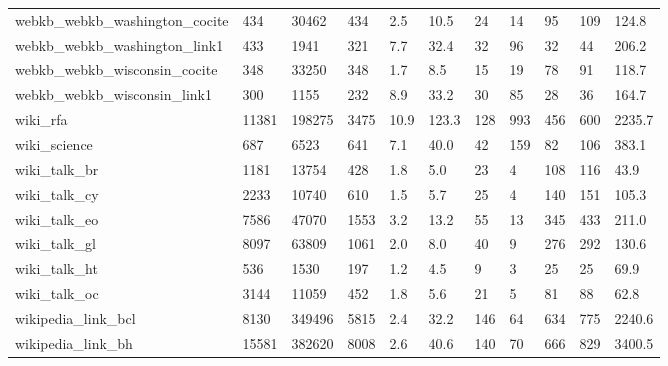 \begin{longtable}{lllllllllll}
 webkb\_webkb\_washington\_cocite                      & 434        & 30462     & 434   & 2.5    & 10.5   & 24    & 14     & 95     & 109    & 124.8   \\
 webkb\_webkb\_washington\_link1                       & 433        & 1941      & 321   & 7.7    & 32.4   & 32    & 96     & 32     & 44     & 206.2   \\
 webkb\_webkb\_wisconsin\_cocite                       & 348        & 33250     & 348   & 1.7    & 8.5    & 15    & 19     & 78     & 91     & 118.7   \\
 webkb\_webkb\_wisconsin\_link1                        & 300        & 1155      & 232   & 8.9    & 33.2   & 30    & 85     & 28     & 36     & 164.7   \\
 wiki\_rfa                                           & 11381      & 198275    & 3475  & 10.9   & 123.3  & 128   & 993    & 456    & 600    & 2235.7  \\
 wiki\_science                                       & 687        & 6523      & 641   & 7.1    & 40.0   & 42    & 159    & 82     & 106    & 383.1   \\
 wiki\_talk\_br                                       & 1181       & 13754     & 428   & 1.8    & 5.0    & 23    & 4      & 108    & 116    & 43.9    \\
 wiki\_talk\_cy                                       & 2233       & 10740     & 610   & 1.5    & 5.7    & 25    & 4      & 140    & 151    & 105.3   \\
 wiki\_talk\_eo                                       & 7586       & 47070     & 1553  & 3.2    & 13.2   & 55    & 13     & 345    & 433    & 211.0   \\
 wiki\_talk\_gl                                       & 8097       & 63809     & 1061  & 2.0    & 8.0    & 40    & 9      & 276    & 292    & 130.6   \\
 wiki\_talk\_ht                                       & 536        & 1530      & 197   & 1.2    & 4.5    & 9     & 3      & 25     & 25     & 69.9    \\
 wiki\_talk\_oc                                       & 3144       & 11059     & 452   & 1.8    & 5.6    & 21    & 5      & 81     & 88     & 62.8    \\
 wikipedia\_link\_bcl                                 & 8130       & 349496    & 5815  & 2.4    & 32.2   & 146   & 64     & 634    & 775    & 2240.6  \\
 wikipedia\_link\_bh                                  & 15581      & 382620    & 8008  & 2.6    & 40.6   & 140   & 70     & 666    & 829    & 3400.5  \\

\end{longtable}
